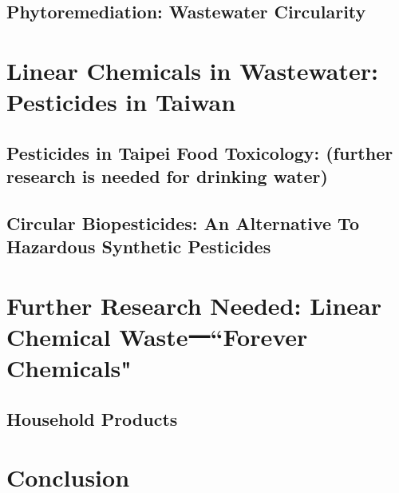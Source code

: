 \subsection{Phytoremediation: Wastewater Circularity}

\section{Linear Chemicals in Wastewater: Pesticides in Taiwan}

\subsection{Pesticides in Taipei Food Toxicology: (further research is needed for drinking water)}

\subsection{Circular Biopesticides: An Alternative To Hazardous Synthetic Pesticides}

\section{Further Research Needed: Linear Chemical Waste一“Forever Chemicals"}

\subsection{Household Products}

\section{Conclusion} 

